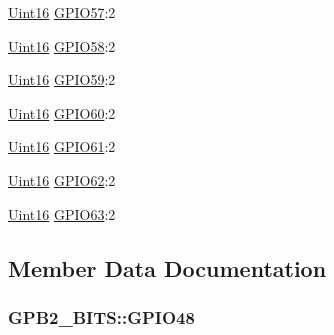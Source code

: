 \begin{DoxyCompactItemize}
\item 
\hyperlink{_d_s_p2833x___device_8h_a59a9f6be4562c327cbfb4f7e8e18f08b}{Uint16} \hyperlink{struct_g_p_b2___b_i_t_s_a4eb396ac5b0076d24b0c7d88b51d68c9}{G\+P\+I\+O57}\+:2
\item 
\hyperlink{_d_s_p2833x___device_8h_a59a9f6be4562c327cbfb4f7e8e18f08b}{Uint16} \hyperlink{struct_g_p_b2___b_i_t_s_a3029d5d3e53a912f315d3d7efa3c5bb7}{G\+P\+I\+O58}\+:2
\item 
\hyperlink{_d_s_p2833x___device_8h_a59a9f6be4562c327cbfb4f7e8e18f08b}{Uint16} \hyperlink{struct_g_p_b2___b_i_t_s_a3a6bd9723e030d8747ebf5550be2f315}{G\+P\+I\+O59}\+:2
\item 
\hyperlink{_d_s_p2833x___device_8h_a59a9f6be4562c327cbfb4f7e8e18f08b}{Uint16} \hyperlink{struct_g_p_b2___b_i_t_s_ab528811be87bab181c54614071ddde20}{G\+P\+I\+O60}\+:2
\item 
\hyperlink{_d_s_p2833x___device_8h_a59a9f6be4562c327cbfb4f7e8e18f08b}{Uint16} \hyperlink{struct_g_p_b2___b_i_t_s_af8de085ba17595d7021db0aac1535f8c}{G\+P\+I\+O61}\+:2
\item 
\hyperlink{_d_s_p2833x___device_8h_a59a9f6be4562c327cbfb4f7e8e18f08b}{Uint16} \hyperlink{struct_g_p_b2___b_i_t_s_ab9866e357590729ca537e8cddc2ccf1a}{G\+P\+I\+O62}\+:2
\item 
\hyperlink{_d_s_p2833x___device_8h_a59a9f6be4562c327cbfb4f7e8e18f08b}{Uint16} \hyperlink{struct_g_p_b2___b_i_t_s_a0b447fc0dae001d71a65a7125084ea29}{G\+P\+I\+O63}\+:2
\end{DoxyCompactItemize}


\subsection{Member Data Documentation}
\hypertarget{struct_g_p_b2___b_i_t_s_a76f2236307c6117b250f8355cf0d61b6}{}
\subsubsection[{G\+P\+I\+O48}]{ G\+P\+B2\+\_\+\+B\+I\+T\+S\+::\+G\+P\+I\+O48}\label{struct_g_p_b2___b_i_t_s_a76f2236307c6117b250f8355cf0d61b6}
\hypertarget{struct_g_p_b2___b_i_t_s_a56892fb034cc01e0cf4bf9c128498a61}{}
